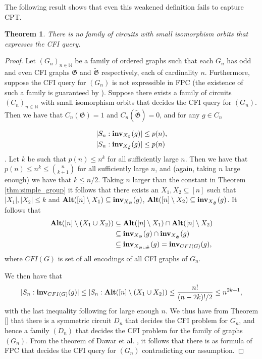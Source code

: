 \documentclass[12pt]{report}
\newtheorem{thm}{Theorem} \newtheorem{claim}{Claim}
\newcommand{\inv}{\text{\textbf{inv}}}
\newcommand{\alt}{\text{\textbf{Alt}}}
\begin{document}
The following result shows that even this weakened definition fails to
capture CPT.
\begin{thm}
  There is no family of circuits with small isomorphism orbits that
  expresses the CFI query.
\end{thm}
\begin{proof}
  Let $(G_n)_{n \in \mathbb{N}}$ be a family of ordered graphs such that each $G_n$ has
  odd and even CFI graphs $\mathfrak{G}$ and $\tilde{\mathfrak{G}}$ respectively, each of
  cardinality $n$. Furthermore, suppose the CFI query for $(G_n)$ is not expressible in
  FPC (the existence of such a family is guaranteed by
  \cite{}). Suppose there exists a family of circuits $(C_n)_{n \in \mathbb{N}}$ with
  small isomorphism orbits that decides the CFI query for $(G_n)$.
  Then we have that $C_n(\mathfrak{G}) = 1$ and
  $C_n(\tilde{\mathfrak{G}}) = 0$, and for any $g \in C_n$

  \begin{align*}
    \vert S_n : \inv_{X_{\mathcal{G}}}(g) \vert &\leq p(n),\\
    \vert S_n : \inv_{X_{\tilde{\mathcal{G}}}}(g) \vert &\leq p(n)
  \end{align*}.
  Let $k$ be such that $p(n) \leq n^k$ for all sufficiently large $n$. Then we have that $p(n) \leq n^k \leq {{n}\choose{k+1}}$ for all sufficiently large $n$, and (again, taking $n$ large enough) we have that $k \leq n/2$. Taking $n$ larger than the constant in Theorem \ref{thm:simple_group} it follows that there exists an $X_1, X_2 \subseteq [n]$ such that $\vert X_1 \vert, \vert X_2 \vert \leq k$ and $\alt ([n] \setminus X_1) \subseteq  \inv_{X_{\mathfrak{G}}}(g)$, $\alt ([n] \setminus X_2) \subseteq  \inv_{X_{\tilde{\mathfrak{G}}}}(g)$. It follows that
  \begin{align*}
    \alt ([n] \setminus (X_1 \cup X_2)) &\subseteq \alt ([n] \setminus X_1) \cap \alt ([n] \setminus X_2)\\
                                        &\subseteq \inv_{X_{\mathfrak{G}}}(g) \cap \inv_{X_{\tilde{\mathfrak{G}}}}(g) \\
                                        &\subseteq \inv_{X_{\mathfrak{G} \cup \tilde{\mathfrak{G}}}}(g) =  \inv_{CFI(G)}(g),
  \end{align*}
  where $CFI(G)$ is set of all encodings of all CFI graphs of $G_n$.

  We then have that
  \begin{align*}
    \vert S_n : \inv_{CFI(G)}(g) \vert \leq \vert S_n : \alt ([n] \setminus (X_1 \cup X_2)) \leq  \frac{n!}{(n-2k)!/2} \leq n^{2k+1},
  \end{align*}
  with the last inequality following for large enough $n$. We thus
  have from Theorem \ref{} that there is a symmetric circuit $D_n$
  that decides the CFI problem for $G_n$, and hence a family $(D_n)$
  that decides the CFI problem for the family of graphs $(G_n)$. From
  the theorem of Dawar et al. \cite{}, it follows that there is as
  formula of FPC that decides the CFI query for $(G_n)$ contradicting
  our assumption.
\end{proof}
\end{document}
